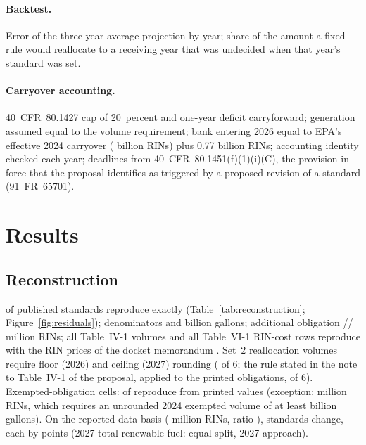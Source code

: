 \documentclass[11pt]{article}
\begin{document}
\paragraph{Backtest.} Error of the three-year-average projection by year; share of the amount a fixed rule would reallocate to a receiving year that was undecided when that year's standard was set.
\paragraph{Carryover accounting.} 40~CFR~80.1427 cap of 20~percent and one-year deficit carryforward; generation assumed equal to the volume requirement; bank entering 2026 equal to EPA's effective 2024 carryover (\valbankRia{} billion RINs) plus 0.77 billion RINs; accounting identity checked each year; deadlines from 40~CFR~80.1451(f)(1)(i)(C), the provision in force that the proposal identifies as triggered by a proposed revision of a standard (91~FR~65701).

\section{Results}

\subsection{Reconstruction}\label{sec:recon}
\valnStandardsMatched{} of \valnStandardsChecked{} published standards reproduce exactly (Table~\ref{tab:reconstruction}; Figure~\ref{fig:residuals}); denominators \valdenominatorFirst{} and \valdenominatorSecond{} billion gallons; additional obligation \valadditionalBBD{}/\valadditionalAB{}/\valadditionalRF{} million RINs; all \valnTableIVOneChecked{} Table~IV-1 volumes and all \valnCostChecked{} Table~VI-1 RIN-cost rows reproduce with the RIN prices of the docket memorandum \citep{docket_0961}. Set~2 reallocation volumes require floor (2026) and ceiling (2027) rounding (\valnSrervFloorCeilMatched{} of 6; the rule stated in the note to Table~IV-1 of the proposal, applied to the printed obligations, \valnSrervNearestMatched{} of 6). Exempted-obligation cells: \valnErvoMatched{} of \valnErvoChecked{} reproduce from printed values (exception: \valervoMismatchDescription{} million RINs, which requires an unrounded 2024 exempted volume of at least \valervoMismatchMinVolumeBgal{} billion gallons). On the reported-data basis (\valreportedTwoZeroTwoFiveExemptedRvo{} million RINs, ratio \valreportedTwoZeroTwoFiveRatio), \valnStandardsChangedByReportedBasis{} standards change, each by \valreportedBasisMaxChangePoints{} points (2027 total renewable fuel: \valreportedBasisStdSecondEqual{} equal split, \valreportedBasisStdSecondAllSecond{} 2027 approach).
\end{document}
